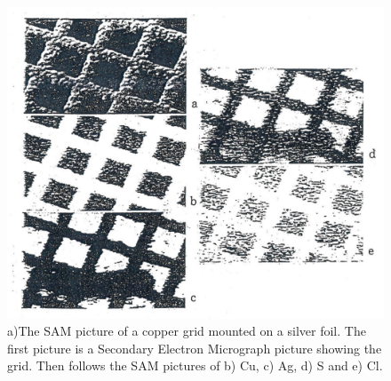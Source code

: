 \begin{figure}[h!]
	\begin{center}
	\includegraphics[scale=3]{figures/06_17.png}
	\caption{a)The SAM picture of a copper grid mounted on a silver foil. The first picture is a Secondary Electron Micrograph picture showing the  grid. Then follows the SAM pictures of b) Cu, c) Ag, d) S and e) Cl.}
	\label{fig:cugrid}
	\end{center}
\end{figure}

